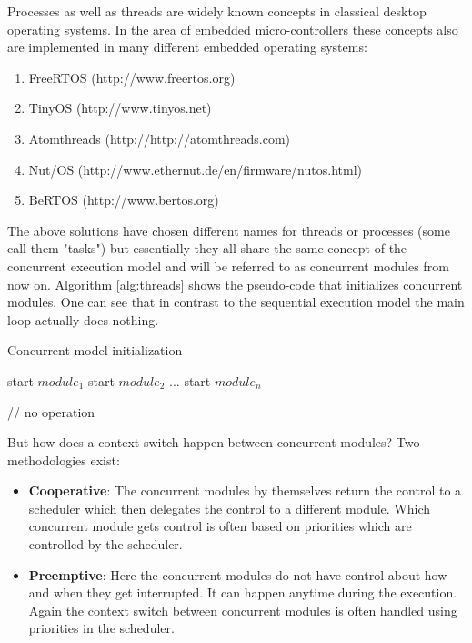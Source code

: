 Processes as well as threads are widely known concepts in classical desktop operating systems. In the area of embedded micro-controllers these concepts also are implemented in many different embedded operating systems:

\begin{enumerate}
    \item FreeRTOS (http://www.freertos.org)
    \item TinyOS (http://www.tinyos.net)
    \item Atomthreads (http://http://atomthreads.com)
    \item Nut/OS (http://www.ethernut.de/en/firmware/nutos.html)
    \item BeRTOS (http://www.bertos.org)
\end{enumerate}

The above solutions have chosen different names for threads or processes (some call them "tasks") but essentially they all share the same concept of the concurrent execution model and will be referred to as concurrent modules from now on. Algorithm \ref{alg:threads} shows the pseudo-code that initializes concurrent modules. One can see that in contrast to the sequential execution model the main loop actually does nothing.

\begin{algorithm}[H]
\caption{Concurrent model initialization}
\label{alg:threads}
\begin{algorithmic}

\STATE start $module_1$
\STATE start $module_2$
\STATE ...
\STATE start $module_n$

    \STATE // no operation
\ENDWHILE
\end{algorithmic}
\end{algorithm}

But how does a context switch happen between concurrent modules? Two methodologies exist:

\begin{itemize}
    \item \textbf{Cooperative}: The concurrent modules by themselves return the control to a scheduler which then delegates the control to a different module. Which concurrent module gets control is often based on priorities which are controlled by the scheduler.
    \item \textbf{Preemptive}: Here the concurrent modules do not have control about how and when they get interrupted. It can happen anytime during the execution. Again the context switch between concurrent modules is often handled using priorities in the scheduler.
\end{itemize}

